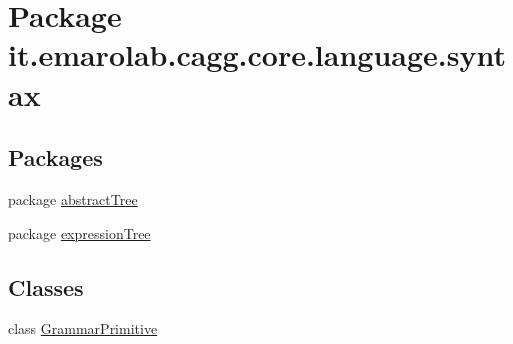 \hypertarget{namespaceit_1_1emarolab_1_1cagg_1_1core_1_1language_1_1syntax}{\section{Package it.\-emarolab.\-cagg.\-core.\-language.\-syntax}
\label{namespaceit_1_1emarolab_1_1cagg_1_1core_1_1language_1_1syntax}
}
\subsection*{Packages}
\begin{DoxyCompactItemize}
\item 
package \hyperlink{namespaceit_1_1emarolab_1_1cagg_1_1core_1_1language_1_1syntax_1_1abstractTree}{abstract\-Tree}
\item 
package \hyperlink{namespaceit_1_1emarolab_1_1cagg_1_1core_1_1language_1_1syntax_1_1expressionTree}{expression\-Tree}
\end{DoxyCompactItemize}
\subsection*{Classes}
\begin{DoxyCompactItemize}
\item 
class \hyperlink{classit_1_1emarolab_1_1cagg_1_1core_1_1language_1_1syntax_1_1GrammarPrimitive}{Grammar\-Primitive}
\end{DoxyCompactItemize}
